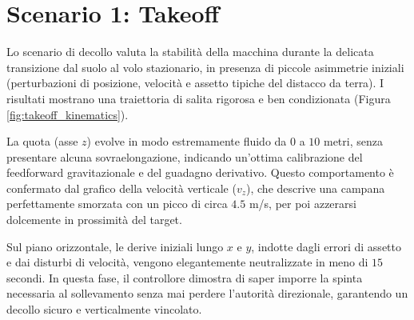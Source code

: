 \begin{table}[htbp]
    \centering
    \caption{Deviazioni standard ($\sigma$) per la perturbazione degli stati iniziali nei tre scenari di test.}
    \label{tab:montecarlo_sigma}
    \vspace{0.5cm}
\end{table}

\section{Scenario 1: Takeoff}
Lo scenario di decollo valuta la stabilità della macchina durante la delicata transizione dal suolo al volo stazionario, in presenza di piccole asimmetrie iniziali (perturbazioni di posizione, velocità e assetto tipiche del distacco da terra). I risultati mostrano una traiettoria di salita rigorosa e ben condizionata (Figura \ref{fig:takeoff_kinematics}). 

La quota (asse $z$) evolve in modo estremamente fluido da $0$ a $10$ metri, senza presentare alcuna sovraelongazione, indicando un'ottima calibrazione del feedforward gravitazionale e del guadagno derivativo. 
Questo comportamento è confermato dal grafico della velocità verticale ($v_z$), che descrive una campana perfettamente smorzata con un picco di circa $4.5$ m/s, per poi azzerarsi dolcemente in prossimità del target. 

Sul piano orizzontale, le derive iniziali lungo $x$ e $y$, indotte dagli errori di assetto e dai disturbi di velocità, vengono elegantemente neutralizzate in meno di $15$ secondi. In questa fase, il controllore dimostra di saper imporre la spinta necessaria al sollevamento senza mai perdere l'autorità direzionale, garantendo un decollo sicuro e verticalmente vincolato.

